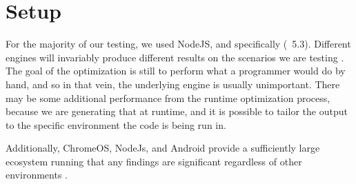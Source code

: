 \section{Setup}

For the majority of our testing, we used NodeJS, and specifically \veight (~5.3). Different engines will invariably produce different results on the scenarios we are testing \cite{engineperf16}.  The goal of the optimization is still to perform what a programmer would do by hand, and so in that vein, the underlying engine is usually unimportant.  There may be some additional performance from the runtime optimization process, because we are generating that at runtime, and it is possible to tailor the output to the specific environment the code is being run in.

Additionally, ChromeOS, NodeJs, and Android provide a sufficiently large ecosystem running \veight that any findings are significant regardless of other \javascript environments \cite{statcounter16}.

